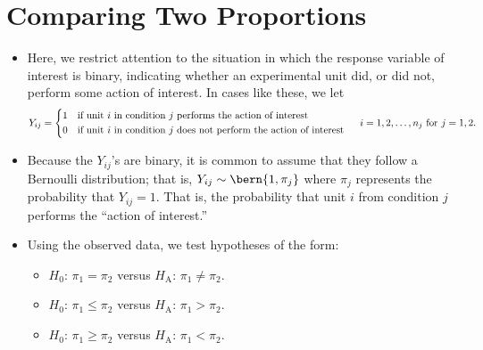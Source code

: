 \section{Comparing Two Proportions}
\begin{itemize}
      \item Here, we restrict attention to the situation in which the response variable of interest
            is binary, indicating whether an experimental unit did, or did not, perform
            some action of interest. In cases like these, we let
            \[ Y_{ij}=\begin{cases*}
                        1 & if unit $ i $ in condition $ j $ performs the action of interest         \\
                        0 & if unit $ i $ in condition $ j $ does not perform the action of interest
                  \end{cases*}\quad i=1,2,\ldots,n_j\text{ for } j=1,2. \]
      \item Because the $ Y_{ij} $'s are binary, it is common to assume that they follow
            a Bernoulli distribution; that is, $ Y_{ij}\sim \bern{1,\pi_j} $ where
            $ \pi_j $ represents the probability that $ Y_{ij}=1 $. That is,
            the probability that unit $ i $ from condition $ j $ performs the ``action of interest.''
      \item Using the observed data, we test hypotheses of the form:
            \begin{itemize}
                  \item $ H_0 $: $ \pi_1=\pi_2 $ versus $ H_\text{A} $: $ \pi_1\ne\pi_2 $.
                  \item $ H_0 $: $ \pi_1\le\pi_2 $ versus $ H_\text{A} $: $ \pi_1>\pi_2 $.
                  \item $ H_0 $: $ \pi_1\ge\pi_2 $ versus $ H_\text{A} $: $ \pi_1<\pi_2 $.
            \end{itemize}
\end{itemize}
